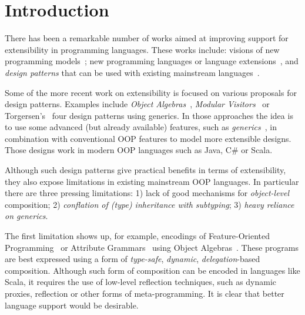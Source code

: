 \section{Introduction}

There has been a remarkable number of works aimed at improving support
for extensibility in programming languages. These works include:
visions of new programming models~\cite{Prehofer97,Tarr99ndegrees,Harrison93subject};
new programming languages or language extensions~\cite{}, and
\emph{design patterns} that can be used with existing mainstream
languages~\cite{togersen:2004,Zenger-Odersky2005,oliveira09modular,oliveira2012extensibility}.



Some of the more recent work on extensibility is focused on various
proposals for design patterns.  Examples include \emph{Object
  Algebras}~\cite{oliveira2012extensibility}, \emph{Modular Visitors}~\cite{oliveira09modular,togersen:2004} or
Torgersen's~\cite{togersen:2004} four design patterns using generics. In those
approaches the idea is to use some advanced (but already available)
features, such as \emph{generics}~\cite{Bracha98making}, in combination with conventional
OOP features to model more extensible designs.  Those designs work in
modern OOP languages such as Java, C\# or Scala.

Although such design patterns give practical benefits in terms of
extensibility, they also expose limitations in existing mainstream OOP
languages. In particular there are three pressing limitations: 
1) lack of good mechanisms for
  \emph{object-level} composition; 2) \emph{conflation of 
    (type) inheritance with subtyping}; 3) \emph{heavy reliance on generics}.

  The first limitation shows up, for example, encodings of Feature-Oriented
  Programming~\cite{Prehofer97} or Attribute Grammars~\cite{Knuth1968} using Object
  Algebras~\cite{oliveira2013feature,rendel14attributes}. These programs are best
  expressed using a form of \emph{type-safe}, \emph{dynamic},
  \emph{delegation}-based composition. Although such form of
  composition can be encoded in languages like Scala, it requires the
  use of low-level reflection techniques, such as dynamic proxies,
  reflection or other forms of meta-programming. It is clear
  that better language support would be desirable.

